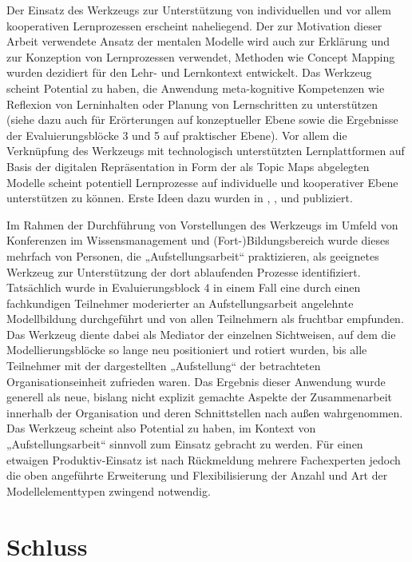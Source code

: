 Der Einsatz des Werkzeugs zur Unterstützung von individuellen und vor allem kooperativen Lernprozessen erscheint naheliegend. Der zur Motivation dieser Arbeit verwendete Ansatz der mentalen Modelle wird auch zur Erklärung und zur Konzeption von Lernprozessen verwendet, Methoden wie Concept Mapping wurden dezidiert für den Lehr- und Lernkontext entwickelt. Das Werkzeug scheint Potential zu haben, die Anwendung meta-kognitive Kompetenzen wie Reflexion von Lerninhalten oder Planung von Lernschritten zu unterstützen (siehe dazu auch \citep{Oppl10a} für Erörterungen auf konzeptueller Ebene sowie die Ergebnisse der Evaluierungsblöcke 3 und 5 auf praktischer Ebene). Vor allem die Verknüpfung des Werkzeugs mit technologisch unterstützten Lernplattformen auf Basis der digitalen Repräsentation in Form der als Topic Maps abgelegten Modelle scheint potentiell Lernprozesse auf individuelle und kooperativer Ebene unterstützen zu können. Erste Ideen dazu wurden in \citep{Oppl09}, \citep{Oppl09c}, \citep{Oppl09d} und \citep{Neubauer09a} publiziert.

Im Rahmen der Durchführung von Vorstellungen des Werkzeugs im Umfeld von Konferenzen im Wissensmanagement und (Fort-)Bildungsbereich wurde dieses mehrfach von Personen, die „Aufstellungsarbeit“ \citep{Sparrer02} praktizieren, als geeignetes Werkzeug zur Unterstützung der dort ablaufenden Prozesse identifiziert. Tatsächlich wurde in Evaluierungsblock 4 in einem Fall eine durch einen fachkundigen Teilnehmer moderierter an Aufstellungsarbeit angelehnte Modellbildung durchgeführt und von allen Teilnehmern als fruchtbar empfunden. Das Werkzeug diente dabei als Mediator der einzelnen Sichtweisen, auf dem die Modellierungsblöcke so lange neu positioniert und rotiert wurden, bis alle Teilnehmer mit der dargestellten „Aufstellung“ der betrachteten Organisationseinheit zufrieden waren. Das Ergebnis dieser Anwendung wurde generell als neue, bislang nicht explizit gemachte Aspekte der Zusammenarbeit innerhalb der Organisation und deren Schnittstellen nach außen wahrgenommen. Das Werkzeug scheint also Potential zu haben, im Kontext von „Aufstellungsarbeit“ sinnvoll zum Einsatz gebracht zu werden. Für einen etwaigen Produktiv-Einsatz ist nach Rückmeldung mehrere Fachexperten jedoch die oben angeführte Erweiterung und Flexibilisierung der Anzahl und Art der Modellelementtypen zwingend notwendig.


\section{Schluss}
\label{sec:schluss}

